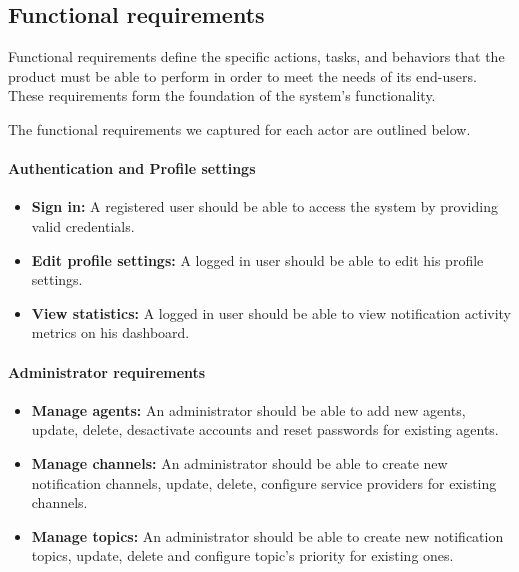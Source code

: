 \subsection{Functional requirements}
\label{freq}
Functional requirements define the specific actions, tasks, and behaviors that the product
must be able to perform in order to meet the needs of its end-users. These requirements
form the foundation of the system's functionality.

\noindent The functional requirements we captured for each actor are outlined below.

\paragraph{Authentication and Profile settings}
\label{common-req}
\begin{itemize}
      \item \textbf{Sign in:} A registered user should be able to access the system by providing
            valid credentials.
      \item \textbf{Edit profile settings:} A logged in user should be able to edit his profile settings.
      \item \textbf{View statistics:} A logged in user should be able to view notification activity metrics
            on his dashboard.
\end{itemize}
\raggedbottom


\paragraph{Administrator requirements}
\label{admin-req}
\begin{itemize}
      \item \textbf{Manage agents:} An administrator should be able to add new agents, update,
            delete, desactivate accounts and reset passwords for existing agents.
      \item \textbf{Manage channels:} An administrator should be able to create new notification channels,
            update, delete, configure service providers for existing channels.
      \item \textbf{Manage topics:} An administrator should be able to create new notification topics,
            update, delete and configure topic's priority for existing ones.
\end{itemize}


